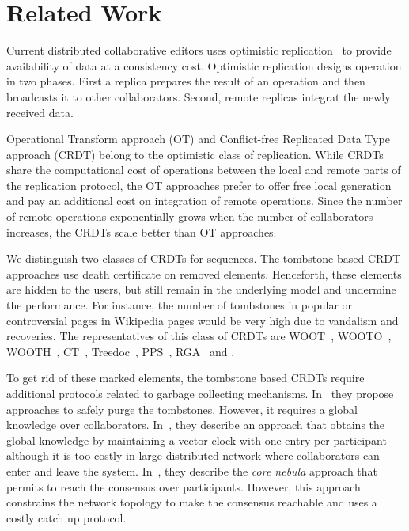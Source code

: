 
\section{Related Work}
\label{sec:relatedwork}
Current distributed collaborative editors uses optimistic
replication~\cite{saito2002replication,saito2005optimistic} to provide
availability of data at a consistency cost. Optimistic replication designs
operation in two phases. First a replica prepares the result of an operation
and then broadcasts it to other collaborators. Second, remote replicas
integrat the newly received data.

Operational Transform approach (OT) and Conflict-free Replicated Data Type
approach (CRDT) belong to the optimistic class of replication. While CRDTs
share the computational cost of operations between the local and remote parts
of the replication protocol, the OT approaches prefer to offer free local
generation and pay an additional cost on integration of remote operations.
Since the number of remote operations exponentially grows when the number of
collaborators increases, the CRDTs scale better than OT approaches.


We distinguish two classes of CRDTs for sequences. The tombstone based CRDT
approaches use death certificate on removed elements. Henceforth, these
elements are hidden to the users, but still remain in the underlying model and
undermine the performance. For instance, the number of tombstones in popular or
controversial pages in Wikipedia pages would be very high due to vandalism and
recoveries. The representatives of this class of CRDTs are
WOOT~\cite{oster2006data}, WOOTO~\cite{weiss2007wooki},
WOOTH~\cite{ahmed2011evaluating}, CT~\cite{grishchenko2010deep},
Treedoc~\cite{preguica2009commutative}, PPS~\cite{wu2010partial},
RGA~\cite{roh2011replicated} and \cite{Yu2012stringwise}.

To get rid of these marked elements, the tombstone based CRDTs require
additional protocols related to garbage collecting
mechanisms. In~\cite{letia2009crdts,roh2011replicated} they propose approaches
to safely purge the tombstones. However, it requires a global knowledge over
collaborators.  In~\cite{roh2011replicated}, they describe an approach that
obtains the global knowledge by maintaining a vector clock with one entry per
participant although it is too costly in large distributed network where
collaborators can enter and leave the system. In~\cite{letia2009crdts}, they
describe the \emph{core nebula} approach that permits to reach the consensus
over participants. However, this approach constrains the network topology to
make the consensus reachable and uses a costly catch up protocol.

